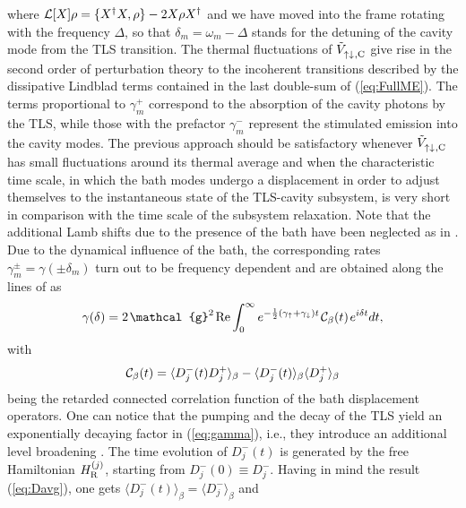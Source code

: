 \documentclass[12pt, a4paper]{iopart}
\begin{document}
where ${\cal L}[X]\rho = \{X^\dag X,\rho\}-2X\rho X^\dag$ and we have moved into the frame rotating with the frequency $\Delta$, so that $\delta_m=\omega_m-\Delta$ stands for the detuning of the cavity mode from the TLS transition. The thermal fluctuations of $\tilde V^{}_{\rm \uparrow\downarrow\:\!,C}$ give rise in the second order of perturbation theory to the incoherent transitions described by the dissipative Lindblad terms contained in the last double-sum of (\ref{eq:FullME}). The terms proportional to $\gamma^+_m$ correspond to the absorption of the cavity photons by the TLS, while those with the prefactor $\gamma^-_m$ represent the stimulated emission into the cavity modes. The previous approach should be satisfactory whenever $\tilde V^{}_{\rm \uparrow\downarrow\:\!,C}$ has small fluctuations around its thermal average and when the characteristic time scale, in which the bath modes undergo a displacement in order to adjust themselves to the instantaneous state of the TLS-cavity subsystem, is very short in comparison with the time scale of the subsystem relaxation. Note that the additional Lamb shifts due to the presence of the bath have been neglected as in \cite{Keeling_PRL-nonequilibrium_model_photon-cond,Keeling-Thermalization_photon_condensate}. Due to the dynamical influence of the bath, the corresponding rates $\gamma^\pm_m=\gamma(\pm\delta_m)$ turn out to be frequency dependent and are obtained along the lines of \cite{Keeling_PRL-nonequilibrium_model_photon-cond,Keeling-Thermalization_photon_condensate,PRL.107.093901} as
%
\begin{equation}\label{eq:gamma}
\gamma(\delta)=2\;\!\mathcal{g}^2\;\!{\rm Re}\int_0^\infty e^{-\frac{1}{2}(\gamma_\uparrow+\gamma_\downarrow)t}\;\!{\cal C}_\beta(t)\;\!e^{i\delta t}dt,
\end{equation}
%
with
%
\begin{equation}\label{eq:C}
{\cal C}_\beta(t)=\langle D_j^-(t)D_j^+\rangle_\beta-\langle D_j^-(t)\rangle_\beta\langle D_j^+\rangle_\beta
\end{equation}
%
being the retarded connected correlation function of the bath displacement operators. One can notice that the pumping and the decay of the TLS yield an exponentially decaying factor in (\ref{eq:gamma}), i.e., they introduce an additional level broadening \cite{PRL.107.093901}. The time evolution of $D_j^-(t)$ is generated by the free Hamiltonian $H^{(j)}_{\rm R}$, starting from $D_j^-(0)\equiv D_j^-$. Having in mind the result (\ref{eq:Davg}), one gets $\langle D_j^-(t)\rangle_\beta=\langle D_j^-\rangle_\beta$ and
\end{document}
